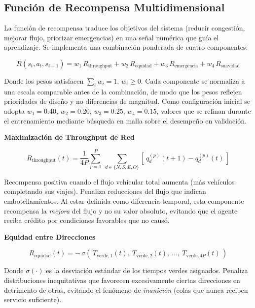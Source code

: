 \documentclass[12pt,a4paper,oneside]{report}
\begin{document}
\subsection{Función de Recompensa Multidimensional}\label{funciuxf3n-de-recompensa-multidimensional}

La función de recompensa traduce los objetivos del sistema (reducir congestión, mejorar flujo, priorizar emergencias) en una señal numérica que guía el aprendizaje. Se implementa una combinación ponderada de cuatro componentes:

\begin{equation}
R(s_{t}, a_{t}, s_{t+1}) = w_{1}\,R_{\text{throughput}} + w_{2}\,R_{\text{equidad}} + w_{3}\,R_{\text{emergencia}} + w_{4}\,R_{\text{suavidad}}
\label{eq:recompensa}
\end{equation}

Donde los pesos satisfacen \(\sum_{i}w_{i} = 1\), \(w_{i} \geq 0\). Cada componente se normaliza a una escala comparable antes de la combinación, de modo que los pesos reflejen prioridades de diseño y no diferencias de magnitud. Como configuración inicial se adopta \(w_{1}=0.40\), \(w_{2}=0.20\), \(w_{3}=0.25\), \(w_{4}=0.15\), valores que se refinan durante el entrenamiento mediante búsqueda en malla sobre el desempeño en validación.

\textbf{Maximización de Throughput de Red}

\begin{equation}
R_{\text{throughput}}(t) = \frac{1}{4P}\sum_{p = 1}^{P}\ \sum_{d \in \{N, S, E, O\}}\left[\, q_{d}^{(p)}(t + 1) - q_{d}^{(p)}(t) \,\right]
\label{eq:rthroughput}
\end{equation}

Recompensa positiva cuando el flujo vehicular total aumenta (más vehículos completando sus viajes). Penaliza reducciones del flujo que indican embotellamientos. Al estar definida como diferencia temporal, esta componente recompensa la \emph{mejora} del flujo y no su valor absoluto, evitando que el agente reciba crédito por condiciones favorables que no causó.

\textbf{Equidad entre Direcciones}

\begin{equation}
R_{\text{equidad}}(t) = -\,\sigma\!\left(\, T_{\text{verde},1}(t),\ T_{\text{verde},2}(t),\ \ldots,\ T_{\text{verde},4P}(t) \,\right)
\label{eq:requidad}
\end{equation}

Donde \(\sigma(\cdot)\) es la desviación estándar de los tiempos verdes asignados. Penaliza distribuciones inequitativas que favorecen excesivamente ciertas direcciones en detrimento de otras, evitando el fenómeno de \emph{inanición} (colas que nunca reciben servicio suficiente).
\end{document}
